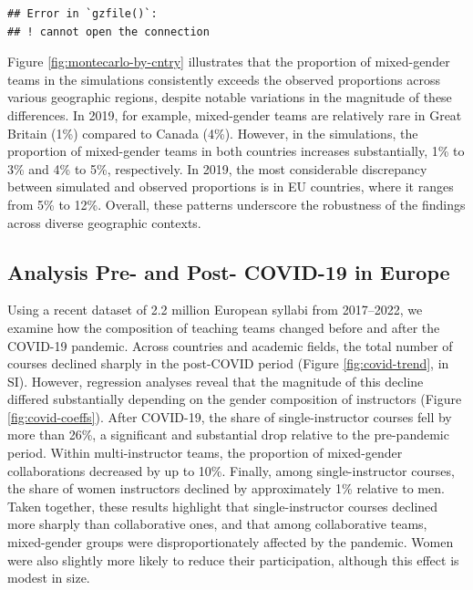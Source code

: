 \documentclass[
  british,
  11pt,
]{article}
\begin{document}
\begin{verbatim}
## Error in `gzfile()`:
## ! cannot open the connection
\end{verbatim}

Figure \ref{fig:montecarlo-by-cntry} illustrates that the proportion of mixed-gender teams in the simulations consistently exceeds the observed proportions across various geographic regions, despite notable variations in the magnitude of these differences. In 2019, for example, mixed-gender teams are relatively rare in Great Britain (1\%) compared to Canada (4\%). However, in the simulations, the proportion of mixed-gender teams in both countries increases substantially, 1\% to 3\% and 4\% to 5\%, respectively. In 2019, the most considerable discrepancy between simulated and observed proportions is in EU countries, where it ranges from 5\% to 12\%. Overall, these patterns underscore the robustness of the findings across diverse geographic contexts.

\subsection{Analysis Pre- and Post- COVID-19 in Europe}\label{analysis-pre--and-post--covid-19-in-europe}

Using a recent dataset of 2.2 million European syllabi from 2017--2022, we examine how the composition of teaching teams changed before and after the COVID-19 pandemic. Across countries and academic fields, the total number of courses declined sharply in the post-COVID period (Figure \ref{fig:covid-trend}, in SI). However, regression analyses reveal that the magnitude of this decline differed substantially depending on the gender composition of instructors (Figure \ref{fig:covid-coeffs}). After COVID-19, the share of single-instructor courses fell by more than 26\%, a significant and substantial drop relative to the pre-pandemic period. Within multi-instructor teams, the proportion of mixed-gender collaborations decreased by up to 10\%. Finally, among single-instructor courses, the share of women instructors declined by approximately 1\% relative to men. Taken together, these results highlight that single-instructor courses declined more sharply than collaborative ones, and that among collaborative teams, mixed-gender groups were disproportionately affected by the pandemic. Women were also slightly more likely to reduce their participation, although this effect is modest in size.
\end{document}
